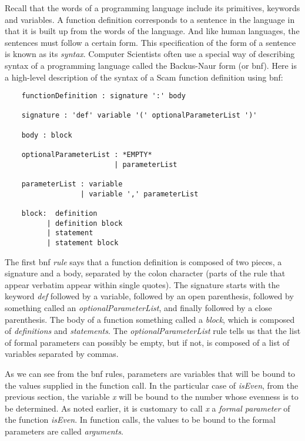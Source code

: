Recall that the words of a programming language include its
primitives, keywords and variables. A function definition
corresponds to a sentence in the language in that it is
built up from the words of the language. And like human
languages, the sentences must follow a certain form. This
specification of the form of a sentence is known as its
{\it syntax}. Computer Scientists often use a special way
of describing syntax of a programming language called the
Backus-Naur form (or {\sc bnf}). Here is a high-level description
of the syntax of a Scam function definition using {\sc bnf}:

\begin{verbatim}
    functionDefinition : signature ':' body

    signature : 'def' variable '(' optionalParameterList ')'

    body : block

    optionalParameterList : *EMPTY*
                          | parameterList
    
    parameterList : variable
                  | variable ',' parameterList
    
    block:  definition 
          | definition block
          | statement
          | statement block
\end{verbatim}

The first {\sc bnf} {\it rule} says that a function definition is
composed of two pieces, a signature and a body, separated
by the colon character
(parts of the rule that appear verbatim appear within single quotes).
The signature starts
with the keyword {\it def}
followed by a variable,
followed by an open parenthesis, followed by something
called an {\it optionalParameterList}, and finally followed by a close
parenthesis.
The body of a function 
something called a {\it block},
which is composed of {\it definitions} and {\it statements}.
The {\it optionalParameterList} rule tells us that
the list of formal parameters can possibly be empty,
but if not, is composed of a list of variables
separated by commas.

As we can see from the {\sc bnf} rules,
parameters are variables that will be bound
to the values supplied in the function call.
In the particular case of {\it isEven}, from the
previous section,
the variable {\it x} will be bound to the number whose
evenness is to be determined. As noted earlier,
it is customary to call {\it x}
a {\it formal parameter} of the function {\it isEven}.
In function calls, the values to be bound to the
formal parameters are called {\it arguments}.

